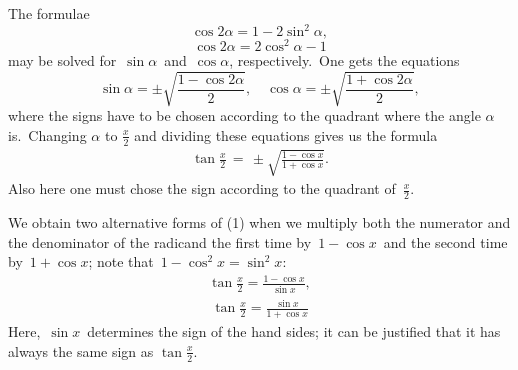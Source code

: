 \documentclass[12pt]{article}
\theoremstyle{definition}
\begin{document}
The formulae
$$\cos{2\alpha} = 1-2\sin^2{\alpha},$$
$$\cos{2\alpha} = 2\cos^2{\alpha}-1$$
may be solved for\, $\sin{\alpha}$\, and\, $\cos{\alpha}$, respectively.\, One gets the equations
$$\sin{\alpha} = \pm\sqrt{\frac{1-\cos{2\alpha}}{2}},\quad\cos{\alpha} = \pm\sqrt{\frac{1+\cos{2\alpha}}{2}},$$
where the signs have to be chosen according to the quadrant where the angle $\alpha$ is.\, Changing $\alpha$ to $\frac{x}{2}$ and dividing these equations gives us the formula
\begin{align}
\tan{\frac{x}{2}}\, = \,\pm\sqrt{\frac{1-\cos{x}}{1+\cos{x}}}.
\end{align}
Also here one must chose the sign according to the quadrant of\, $\displaystyle\frac{x}{2}$.

We obtain two alternative forms of (1) when we multiply both the numerator and
 the denominator of the radicand the first time by\, $1-\cos{x}$\, and the 
second time by\, $1+\cos{x}$; note that\, $1-\cos^2{x} = \sin^2{x}$:
\begin{align}
\tan{\frac{x}{2}} = \frac{1-\cos{x}}{\sin{x}},
\end{align}
\begin{align}
\tan{\frac{x}{2}} = \frac{\sin{x}}{1+\cos{x}}
\end{align}
Here,\, $\sin{x}$\, determines the sign of the  hand sides; 
it can be justified that it has always the same sign as $\tan{\frac{x}{2}}$.
\end{document}
